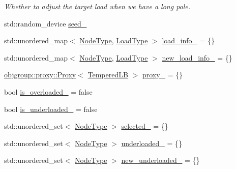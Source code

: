 \begin{DoxyCompactItemize}
\begin{DoxyCompactList}\small\item\em Whether to adjust the target load when we have a long pole. \end{DoxyCompactList}\item 
std\+::random\+\_\+device \hyperlink{structvt_1_1vrt_1_1collection_1_1lb_1_1_tempered_l_b_a2384a463adae3c446a12df983aa0c901}{seed\+\_\+}
\item 
std\+::unordered\+\_\+map$<$ \hyperlink{namespacevt_a866da9d0efc19c0a1ce79e9e492f47e2}{Node\+Type}, \hyperlink{structvt_1_1vrt_1_1collection_1_1lb_1_1_base_l_b_a215e22b9f12678303f49615ae3be05cc}{Load\+Type} $>$ \hyperlink{structvt_1_1vrt_1_1collection_1_1lb_1_1_tempered_l_b_a0262ca11f901c152c0d13fa64701fb44}{load\+\_\+info\+\_\+} = \{\}
\item 
std\+::unordered\+\_\+map$<$ \hyperlink{namespacevt_a866da9d0efc19c0a1ce79e9e492f47e2}{Node\+Type}, \hyperlink{structvt_1_1vrt_1_1collection_1_1lb_1_1_base_l_b_a215e22b9f12678303f49615ae3be05cc}{Load\+Type} $>$ \hyperlink{structvt_1_1vrt_1_1collection_1_1lb_1_1_tempered_l_b_a117b1bb212ced62335f93bfbc825ca9d}{new\+\_\+load\+\_\+info\+\_\+} = \{\}
\item 
\hyperlink{structvt_1_1objgroup_1_1proxy_1_1_proxy}{objgroup\+::proxy\+::\+Proxy}$<$ \hyperlink{structvt_1_1vrt_1_1collection_1_1lb_1_1_tempered_l_b}{Tempered\+LB} $>$ \hyperlink{structvt_1_1vrt_1_1collection_1_1lb_1_1_tempered_l_b_aca418d6158bfb01b3ab55224419f34be}{proxy\+\_\+} = \{\}
\item 
bool \hyperlink{structvt_1_1vrt_1_1collection_1_1lb_1_1_tempered_l_b_af7e60fc255a3ebe6625f48b622d61a84}{is\+\_\+overloaded\+\_\+} = false
\item 
bool \hyperlink{structvt_1_1vrt_1_1collection_1_1lb_1_1_tempered_l_b_a53aba7cc0f8809e7c69d660b79b7542c}{is\+\_\+underloaded\+\_\+} = false
\item 
std\+::unordered\+\_\+set$<$ \hyperlink{namespacevt_a866da9d0efc19c0a1ce79e9e492f47e2}{Node\+Type} $>$ \hyperlink{structvt_1_1vrt_1_1collection_1_1lb_1_1_tempered_l_b_a95bdd9680feda06ca966311f0e3ca9b3}{selected\+\_\+} = \{\}
\item 
std\+::unordered\+\_\+set$<$ \hyperlink{namespacevt_a866da9d0efc19c0a1ce79e9e492f47e2}{Node\+Type} $>$ \hyperlink{structvt_1_1vrt_1_1collection_1_1lb_1_1_tempered_l_b_a1fecccd06fbeae5e5632998140a3b3b7}{underloaded\+\_\+} = \{\}
\item 
std\+::unordered\+\_\+set$<$ \hyperlink{namespacevt_a866da9d0efc19c0a1ce79e9e492f47e2}{Node\+Type} $>$ \hyperlink{structvt_1_1vrt_1_1collection_1_1lb_1_1_tempered_l_b_a23d97f7d493c9e871e33748f90702dfe}{new\+\_\+underloaded\+\_\+} = \{\}

\end{DoxyCompactItemize}
